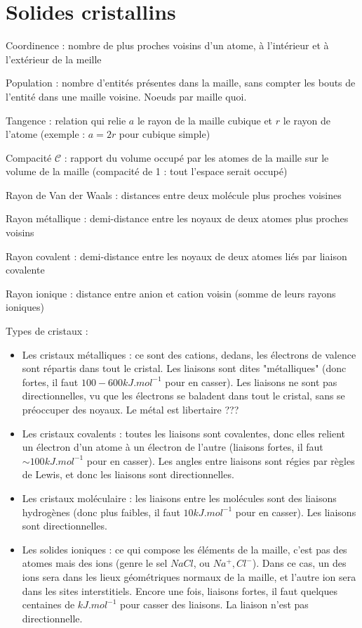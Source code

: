 \documentclass[a4paper,12pt]{book}
\newcommand{\Def}[2]{\begin{tcolorbox}[colback=white,colframe=red!10!green!20!blue!75!, title=Définition : #1]#2\end{tcolorbox}}
\begin{document}
\section{Solides cristallins}
\Def{Grandeurs}{Coordinence : nombre de plus proches voisins d'un atome, à l'intérieur et à l'extérieur de la meille
\par Population : nombre d'entités présentes dans la maille, sans compter les bouts de l'entité dans une maille voisine. Noeuds par maille quoi.
\par Tangence : relation qui relie $a$ le rayon de la maille cubique et $r$ le rayon de l'atome (exemple : $a = 2r$ pour cubique simple)
\par Compacité $\mathcal{C}$ : rapport du volume occupé par les atomes de la maille sur le volume de la maille (compacité de 1 : tout l'espace serait occupé)
\par Rayon de Van der Waals : distances entre deux molécule plus proches voisines
\par Rayon métallique : demi-distance entre les noyaux de deux atomes plus proches voisins
\par Rayon covalent : demi-distance entre les noyaux de deux atomes liés par liaison covalente
\par Rayon ionique : distance entre anion et cation voisin (somme de leurs rayons ioniques)}

\Def{Types de cristaux}{Types de cristaux :\begin{itemize}
\item Les cristaux métalliques : ce sont des cations, dedans, les électrons de valence sont répartis dans tout le cristal. Les liaisons sont dites "métalliques" (donc fortes, il faut $100-600kJ.mol^{-1}$ pour en casser). Les liaisons ne sont pas directionnelles, vu que les électrons se baladent dans tout le cristal, sans se préoccuper des noyaux. Le métal est libertaire ???
\item Les cristaux covalents : toutes les liaisons sont covalentes, donc elles relient un électron d'un atome à un électron de l'autre (liaisons fortes, il faut $\sim100kJ.mol^{-1}$ pour en casser). Les angles entre liaisons sont régies par règles de Lewis, et donc les liaisons sont directionnelles.
\item Les cristaux moléculaire : les liaisons entre les molécules sont des liaisons hydrogènes  (donc plus faibles, il faut $10kJ.mol^{-1}$ pour en casser). Les liaisons sont directionnelles.
\item Les solides ioniques : ce qui compose les éléments de la maille, c'est pas des atomes mais des ions (genre le sel $NaCl$, ou $Na^+, Cl^-$). Dans ce cas, un des ions sera dans les lieux géométriques normaux de la maille, et l'autre ion sera dans les sites interstitiels. Encore une fois, liaisons fortes, il faut quelques centaines de $kJ.mol^{-1}$ pour casser des liaisons. La liaison n'est pas directionnelle.
\end{itemize}}
\end{document}
